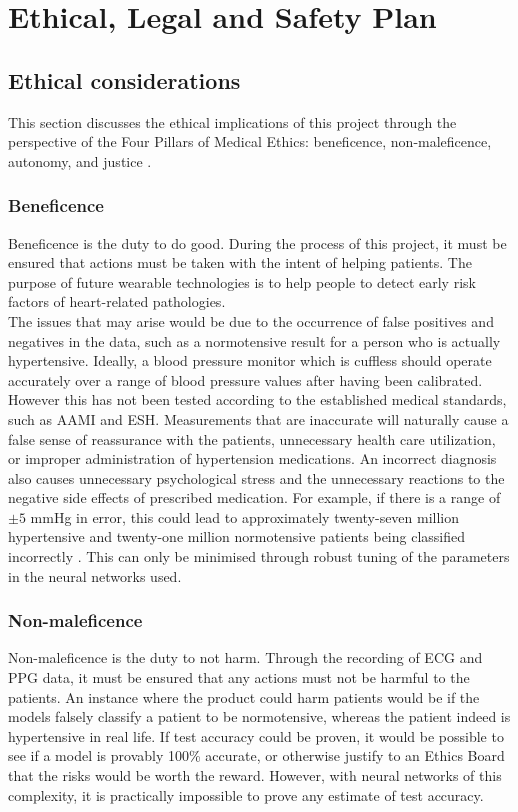 \section{Ethical, Legal and Safety Plan}

\subsection{Ethical considerations}
This section discusses the ethical implications of this project through the perspective 
of the Four Pillars of Medical Ethics: beneficence, non-maleficence, autonomy, and 
justice \cite{MedicalEthics}. 

\subsubsection{Beneficence}
Beneficence is the duty to do good. During the process of this project, it must be 
ensured that actions must be taken with the intent of helping patients. The purpose 
of future wearable technologies is to help people to detect early risk factors of 
heart-related pathologies. \\ \newline \noindent The issues that may arise would 
be due to the occurrence of false positives and negatives in the data, such as 
a normotensive result for a person who is actually hypertensive. Ideally, a 
blood pressure monitor which is cuffless should operate accurately over a 
range of blood pressure values after having been calibrated. However this 
has not been tested according to the established medical standards, such 
as AAMI and ESH. Measurements that are inaccurate will naturally cause a 
false sense of reassurance with the patients, unnecessary health care 
utilization, or improper administration of hypertension medications. 
An incorrect diagnosis also causes unnecessary psychological stress and 
the unnecessary reactions to the negative side effects of prescribed 
medication. For example, if there is a range of $\pm 5$ mmHg in error, 
this could lead to approximately twenty-seven million hypertensive and 
twenty-one million normotensive patients being classified 
incorrectly \cite{Bard2019}. This can only be minimised through robust 
tuning of the parameters in the neural networks used.

\subsubsection{Non-maleficence}
Non-maleficence is the duty to not harm. Through the recording of ECG and PPG 
data, it must be ensured that any actions must not be harmful to the patients. 
An instance where the product could harm patients would be if the models 
falsely classify a patient to be normotensive, whereas the patient indeed 
is hypertensive in real life. If test accuracy could be proven, it would 
be possible to see if a model is provably 100\% accurate, or otherwise 
justify to an Ethics Board that the risks would be worth the reward. However, 
with neural networks of this complexity, it is practically impossible to
 prove any estimate of test accuracy. 

